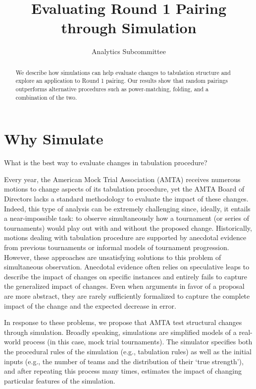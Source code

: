 \documentclass{tufte-handout}
\title{Evaluating Round 1 Pairing through Simulation%
}
\author{Analytics Subcommittee}
\begin{document}
\maketitle

\begin{abstract}
\noindent We describe how simulations can help evaluate 
changes to tabulation structure and explore an application to Round 1 pairing. Our results show that random pairings outperforms alternative procedures such as power-matching, folding, and a combination of the two.
\end{abstract}


\section{Why Simulate}
What is the best way to evaluate changes in tabulation procedure?

Every year, the American Mock Trial Association (AMTA) receives numerous motions to change aspects of its tabulation procedure, yet the AMTA Board of Directors lacks a standard methodology to evaluate the impact of these changes. Indeed, this type of analysis can be extremely challenging since, ideally, it entails a near-impossible task: to observe simultaneously how a tournament (or series of tournaments) would play out with and without the proposed change. %
Historically, motions dealing with tabulation procedure are supported by anecdotal evidence from previous tournaments or informal models of tournament progression. However, these approaches are unsatisfying solutions to this problem of simultaneous observation. Anecdotal evidence often relies on speculative leaps to describe the impact of changes on specific instances and entirely fails to capture the generalized impact of changes. Even when arguments in favor of a proposal are more abstract, they are rarely sufficiently formalized to capture the complete impact of the change and the expected decrease in error.

In response to these problems, we propose that AMTA test structural changes through simulation. Broadly speaking, simulations are simplified models of a real-world process (in this case, mock trial tournaments). The simulator specifies both the procedural rules of the simulation (e.g., tabulation rules) as well as the initial inputs (e.g., the number of teams and the distribution of their `true strength'), and after repeating this process many times, estimates the impact of changing particular features of the simulation.
\end{document}
